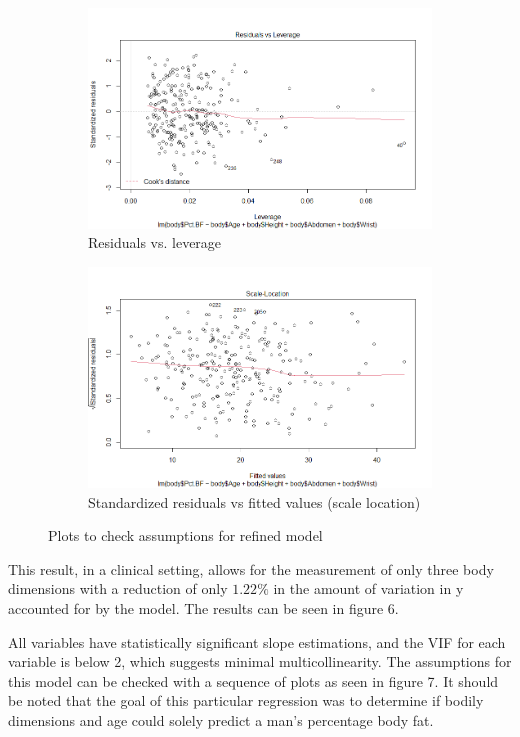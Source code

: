 \documentclass[12pt]{article}
\begin{document}
\begin{figure}
\newline

\begin{subfigure}{.45\textwidth}
  \centering
  \includegraphics[width=.8\linewidth]{residvlev2.png}  
  \caption{Residuals vs. leverage}
  \label{fig:sub-third}
\end{subfigure}
\begin{subfigure}{.45\textwidth}
  \centering
  \includegraphics[width=.8\linewidth]{scaleloc2.png}
  
  \caption{Standardized residuals vs fitted values (scale location)}
  \label{fig:sub-fourth}
\end{subfigure}
\caption{Plots to check assumptions for refined model}
\label{fig:fig2}
\end{figure}

This result, in a clinical setting, allows for the measurement of only three body dimensions with a reduction of only $1.22\%$ in the amount of variation in y accounted for by the model. The results can be seen in figure 6.



All variables have statistically significant slope estimations, and the VIF for each variable is below 2, which suggests minimal multicollinearity. The assumptions for this model can be checked with a sequence of plots as seen in figure 7. It should be noted that the goal of this particular regression was to determine if bodily dimensions and age could solely predict a man's percentage body fat. 
\end{document}
